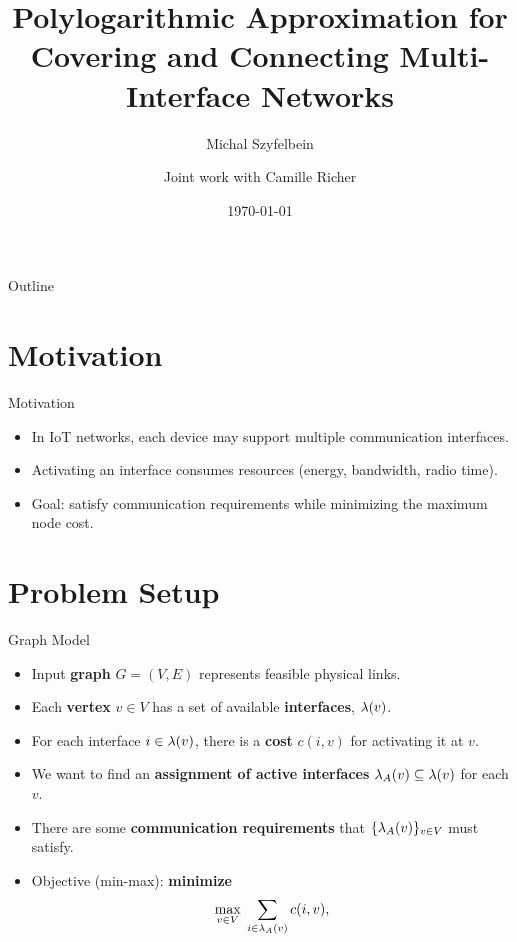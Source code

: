 \documentclass[aspectratio=169]{beamer}
\title[Multi-Interface Networks]{Polylogarithmic Approximation for Covering and Connecting Multi-Interface Networks}
\subtitle{Michal Szyfelbein}
\author{Joint work with Camille Richer}
\institute{University of Gdańsk}
\date{\today}
\begin{document}
\begin{frame}
  \titlepage
\end{frame}

\begin{frame}{Outline}
  \tableofcontents
\end{frame}

\section{Motivation}
\begin{frame}{Motivation}
  \begin{itemize}
    \item In IoT networks, each device may support multiple communication interfaces.
    \pause
    \item Activating an interface consumes resources (energy, bandwidth, radio time).
    \pause
    \item Goal: satisfy communication requirements while minimizing the maximum node cost.
  \end{itemize}
\end{frame}

\section{Problem Setup}
\begin{frame}{Graph Model}
  \begin{itemize}
    \item Input \textbf{graph} $G=(V,E)$ represents feasible physical links.
    \pause
    \item Each \textbf{vertex} $v \in V$ has a set of available \textbf{interfaces}, $\lambda\mathopen{}\left( v \right)$.
    \pause
    \item For each interface $i \in \lambda\mathopen{}\left( v \right)$, there is a \textbf{cost} $c(i,v)$ for activating it at $v$.
    \pause
    \item We want to find an \textbf{assignment of active interfaces} $\lambda_A\mathopen{}\left( v \right) \subseteq \lambda\mathopen{}\left( v \right)$ for each $v$.
    \pause
    \item There are some \textbf{communication requirements} that $\{\lambda_A\mathopen{}\left( v \right)\}_{v\in V}$ must satisfy.
    \pause
    \item Objective (min-max): \textbf{minimize}
    \[
      \max_{v \in V} \; \sum_{i \in \lambda_A\mathopen{}\left( v \right)} c(i,v),
    \]
  \end{itemize}
\end{frame}
\end{document}
